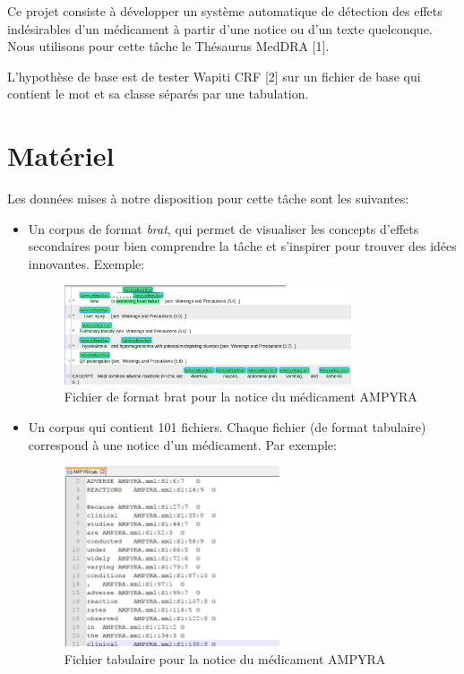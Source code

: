 \documentclass[a4paper,english,11pt]{article}
\begin{document}
Ce projet consiste à développer un système automatique de détection des effets indésirables d'un médicament à partir d'une notice ou d'un texte quelconque. Nous utilisons pour cette tâche le Thésaurus MedDRA [1].

L'hypothèse de base est de tester Wapiti CRF [2] sur un fichier de base qui contient le mot et sa classe séparés par une tabulation.

\section{Matériel}
Les données mises à notre disposition pour cette tâche sont les suivantes:

\begin{itemize}
	\item Un corpus de format \emph{brat}, qui permet de visualiser les concepts d'effets secondaires pour bien comprendre la tâche et s'inspirer pour trouver des idées innovantes. Exemple:
	
	\begin{figure}[H]
		\centering
		\includegraphics[width=0.8\textwidth,keepaspectratio]{fichier_brat}
		\caption{Fichier de format brat pour la notice du médicament AMPYRA\label{}}
	\end{figure}
		
	\item Un corpus qui contient 101 fichiers. Chaque fichier (de format tabulaire) correspond à une notice d'un médicament. Par exemple:
	
	\begin{figure}[H]
		\centering
		\includegraphics[width=0.6\textwidth,keepaspectratio]{fichier_tab}
		\caption{Fichier tabulaire pour la notice du médicament AMPYRA\label{}}
	\end{figure}


\end{itemize}
\end{document}
